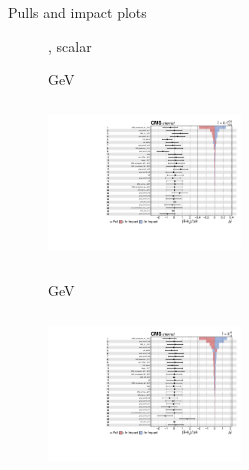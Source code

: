 \documentclass[8pt]{beamer}
\begin{document}
\begin{frame}{Pulls and impact plots}
\justifying
\begin{figure}[htbp]
\centering
\begin{block}{, scalar}\end{block}	\vspace{-8pt}

\begin{minipage}[b]{0.49\textwidth}
\begin{center}
\centering \begin{block}{ GeV}\end{block}	
\includegraphics[width=5.1cm, height=4.2cm]{figs/impacts_2017_both_scalar_100.pdf}
\end{center}
\end{minipage}\hfill
\begin{minipage}[b]{0.49\textwidth}
\begin{center}
\centering \begin{block}{ GeV}\end{block}	
\includegraphics[width=5.1cm, height=4.2cm]{figs/impacts_2017_both_scalar_500.pdf}
\end{center}
\end{minipage} \hfill
\end{figure}
\end{frame}
\end{document}
